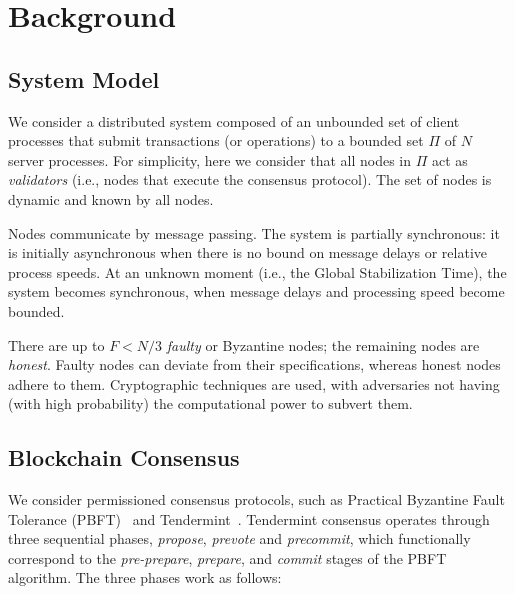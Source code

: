 \section{Background}
\label{sec:background}


\subsection{System Model}

We consider a distributed system composed of an unbounded set of client processes that submit transactions (or operations) to a bounded set $\Pi$ of $N$ server processes.   
For simplicity, here we consider that all nodes in $\Pi$ act as \emph{validators} (i.e., nodes that execute the consensus protocol).
The set of nodes is dynamic and known by all nodes.  

Nodes communicate by message passing. 
The system is partially synchronous: it is initially asynchronous when there is no bound on message delays or relative process speeds.
At an unknown moment (i.e., the Global Stabilization Time), the system becomes synchronous, when message delays and processing speed become bounded.

There are up to $F < N/3$ \emph{faulty} or Byzantine nodes; the remaining nodes are \emph{honest}.
Faulty nodes can deviate from their specifications, whereas honest nodes adhere to them.
Cryptographic techniques are used, with adversaries not having (with high probability) the computational power to subvert them.


\subsection{Blockchain Consensus}
\label{tenderback}

We consider permissioned consensus protocols, such as Practical Byzantine Fault Tolerance (PBFT)~\cite{castro1999practical} and Tendermint~\cite{buchman2016tendermint}.
Tendermint consensus operates through three sequential phases, \emph{propose}, \emph{prevote} and \emph{precommit}, which functionally correspond to the \emph{pre-prepare}, \emph{prepare}, and \emph{commit} stages of the PBFT algorithm. The three phases work as follows: 

